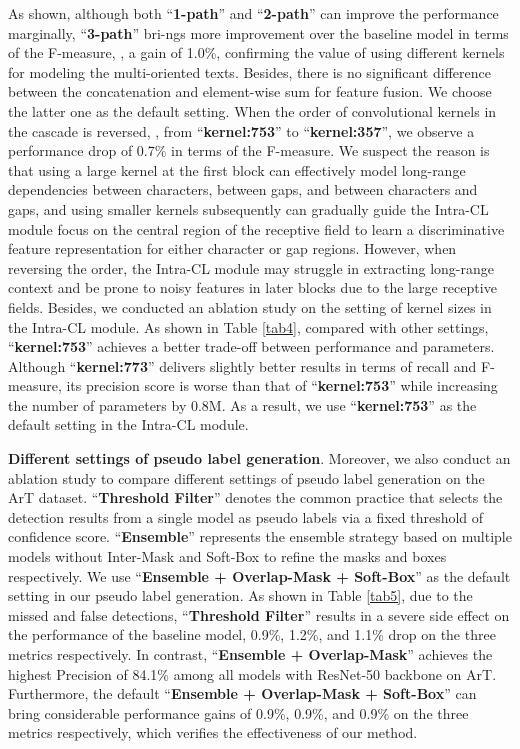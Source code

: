 As shown, although both ``\textbf{1-path}'' and ``\textbf{2-path}'' can improve the performance marginally, ``\textbf{3-path}'' bri-ngs more improvement over the baseline model in terms of the F-measure, , a gain of 1.0\%, confirming the value of using different kernels for modeling the multi-oriented texts. Besides, there is no significant difference between the concatenation and element-wise sum for feature fusion. We choose the latter one as the default setting. When the order of convolutional kernels in the cascade is reversed, , from ``\textbf{kernel:753}'' to ``\textbf{kernel:357}'', we observe a performance drop of 0.7\% in terms of the F-measure. We suspect the reason is that using a large kernel at the first block can effectively model long-range dependencies between characters, between gaps, and between characters and gaps, and using smaller kernels subsequently can gradually guide the Intra-CL module focus on the central region of the receptive field to learn a discriminative feature representation for either character or gap regions. However, when reversing the order, the Intra-CL module may struggle in extracting long-range context and be prone to noisy features in later blocks due to the large receptive fields. Besides, we conducted an ablation study on the setting of kernel sizes in the Intra-CL module. As shown in Table \ref{tab4}, compared with other settings, ``\textbf{kernel:753}'' achieves a better trade-off between performance and parameters. Although ``\textbf{kernel:773}'' delivers slightly better results in terms of recall and F-measure, its precision score is worse than that of ``\textbf{kernel:753}'' while increasing the number of parameters by 0.8M. As a result, we use ``\textbf{kernel:753}'' as the default setting in the Intra-CL module.


\textbf{Different settings of pseudo label generation}. Moreover, we also conduct an ablation study to compare different settings of pseudo label generation on the ArT dataset. ``\textbf{Threshold Filter}'' denotes the common practice that selects the detection results from a single model as pseudo labels via a fixed threshold of confidence score. ``\textbf{Ensemble}'' represents the ensemble strategy based on multiple models without Inter-Mask and Soft-Box to refine the masks and boxes respectively. We use ``\textbf{Ensemble + Overlap-Mask + Soft-Box}'' as the default setting in our pseudo label generation. As shown in Table \ref{tab5}, due to the missed and false detections, ``\textbf{Threshold Filter}'' results in a severe side effect on the performance of the baseline model,  0.9\%, 1.2\%, and 1.1\% drop on the three metrics respectively. In contrast, ``\textbf{Ensemble + Overlap-Mask}'' achieves the highest Precision of 84.1\% among all models with ResNet-50 backbone on ArT. Furthermore, the default ``\textbf{Ensemble + Overlap-Mask + Soft-Box}'' can bring considerable performance gains of 0.9\%, 0.9\%, and 0.9\% on the three metrics respectively, which verifies the effectiveness of our method.



